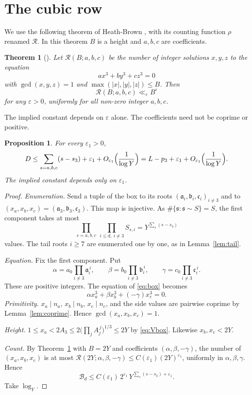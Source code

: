 \documentclass{amsart}
\newtheorem{theoremA}{Theorem}
\newtheorem{proposition}[lemma]{Proposition}
\theoremstyle{definition}
\theoremstyle{plain}
\numberwithin{equation}{section}
\numberwithin{table}{section}
\begin{document}
\section{The cubic row}\label{sec:hb3}

We use the following theorem of Heath-Brown \cite[Theorem~1.3]{HBcube}, with
its counting function $\rho$ renamed $\mathcal R$. In this theorem $B$ is a
height and $a,b,c$ are coefficients.

\begin{theoremA}[{\cite[Theorem~1.3]{HBcube}}]\label{thm:HBcubic}
Let $\mathcal R(B;a,b,c)$ be the number of integer solutions $x,y,z$ to the equation
\[
 ax^3+by^3+cz^3=0
\]
with $\gcd(x,y,z)=1$ and $\max(|x|,|y|,|z|)\le B$. Then
\[\mathcal R(B;a,b,c)\ll_\varepsilon B^\varepsilon\]
for any $\varepsilon>0$, uniformly for all non-zero integer $a,b,c$.
\end{theoremA}

The implied constant depends on $\varepsilon$ alone. The coefficients need
not be coprime or positive.

\begin{proposition}\label{prop:HB3}
For every $\varepsilon_1>0$,
\begin{equation}\label{eq:HB3}
 D\le\sum_{s=a,b,c}(s-s_3)+\varepsilon_1+O_{\varepsilon_1}\Bigl(\frac1{\log Y}\Bigr)
 =L-p_3+\varepsilon_1+O_{\varepsilon_1}\Bigl(\frac1{\log Y}\Bigr).
\end{equation}
The implied constant depends only on $\varepsilon_1$.
\end{proposition}

\begin{proof}
\emph{Enumeration.} Send a tuple of the box to its roots
$(\mathfrak a_i,\mathfrak b_i,\mathfrak c_i)_{i\ne3}$ and to
$(x_a,x_b,x_c)=(\mathfrak a_3,\mathfrak b_3,\mathfrak c_3)$. This map is injective.
As $\#\{\mathfrak s:\mathfrak s\sim S\}=S$, the first component takes at most
\[
 \prod_{s=a,b,c}\ \prod_{i\le d,\ i\ne3}S_{s,i}=Y^{\sum_s(s-s_3)}
\]
values. The tail roots $i\ge7$ are enumerated one by one, as in
Lemma~\ref{lem:tail}.

\emph{Equation.} Fix the first component. Put
\[
 \alpha=a_0\prod_{i\ne3}\mathfrak a_i^{\,i},\qquad
 \beta=b_0\prod_{i\ne3}\mathfrak b_i^{\,i},\qquad
 \gamma=c_0\prod_{i\ne3}\mathfrak c_i^{\,i}.
\]
These are positive integers. The equation of \eqref{eq:box} becomes
\[
\alpha x_a^3+\beta x_b^3+(-\gamma)x_c^3=0 .
\]
\emph{Primitivity.} $x_a\mid n_a$, $x_b\mid n_b$, $x_c\mid n_c$, and the side values
are pairwise coprime by Lemma~\ref{lem:coprime}. Hence
$\gcd(x_a,x_b,x_c)=1$.

\emph{Height.} $1\le x_a<2A_3\le2\bigl(\prod_jA_j^{\,j}\bigr)^{1/3}\le2Y$ by
\eqref{eq:Vbox}. Likewise $x_b,x_c<2Y$.

\emph{Count.} By Theorem~\ref{thm:HBcubic} with $B=2Y$ and coefficients
$(\alpha,\beta,-\gamma)$, the number of $(x_a,x_b,x_c)$ is at most
$\mathcal R(2Y;\alpha,\beta,-\gamma)\le C(\varepsilon_1)(2Y)^{\varepsilon_1}$,
uniformly in $\alpha,\beta,\gamma$. Hence
\[
 \mathcal B_d\le C(\varepsilon_1)\,2^{\varepsilon_1}\,Y^{\sum_s(s-s_3)+\varepsilon_1}.
\]
Take $\log_Y$.
\end{proof}
\end{document}
